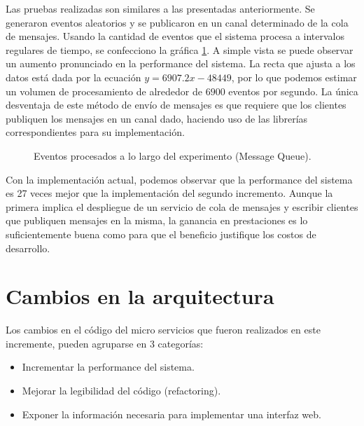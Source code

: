 \documentclass[a4paper,10pt, oneside]{article}
\begin{document}
Las pruebas realizadas son similares a las presentadas anteriormente. Se generaron eventos aleatorios y se publicaron en un canal determinado de la cola de mensajes. Usando la cantidad de eventos que el sistema procesa a intervalos regulares de tiempo, se confecciono la gráfica \ref{fig:MQ}. A simple vista se puede observar un aumento pronunciado en la performance del sistema. La recta que ajusta a los datos está dada por la ecuación $y = 6907.2 x - 48449$, por lo que podemos estimar un volumen de procesamiento de alrededor de $6900$ eventos por segundo. La única desventaja de este método de envío de mensajes es que requiere que los clientes publiquen los mensajes en un canal dado, haciendo uso de las librerías correspondientes para su implementación.
\begin{figure}[htpb]
	\centering
	
	\caption{Eventos procesados a lo largo del experimento (Message Queue).} \label{fig:MQ}
\end{figure}

Con la implementación actual, podemos observar que la performance del sistema es 27 veces mejor que la implementación del segundo incremento. Aunque la primera implica el despliegue de un servicio de cola de mensajes y escribir clientes que publiquen mensajes en la misma, la ganancia en prestaciones es lo suficientemente buena como para que el beneficio justifique los costos de desarrollo.

\section{Cambios en la arquitectura}
Los cambios en el código del micro servicios que fueron realizados en este incremente, pueden agruparse en 3 categorías:
\begin{itemize}
	\item Incrementar la performance del sistema.
	\item Mejorar la legibilidad del código (refactoring).
	\item Exponer la información necesaria para implementar una interfaz web.
\end{itemize}
\end{document}
